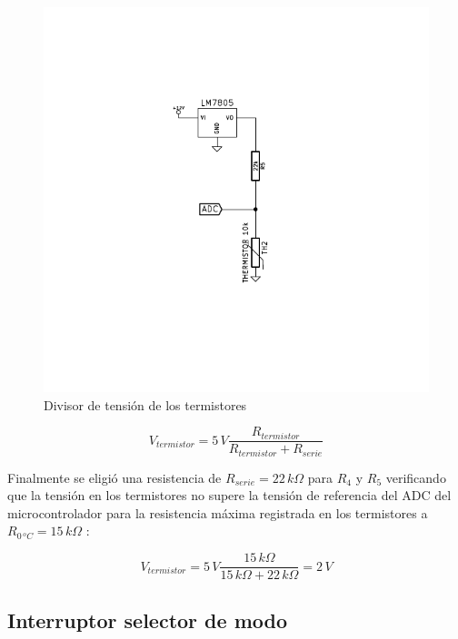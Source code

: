 \documentclass[10pt,spanish,a4paper,openany,notitlepage]{article}
\begin{document}
\begin{figure}[H] %
\begin{center}
\includegraphics[scale=1.25]{../circuitos/temperatura.pdf}
\caption{Divisor de tensión de los termistores}
 \label{fig:temperatura}
\end{center}
\end{figure}

\begin{equation}
V_{termistor} = 5\, \unit{V} \frac{R_{termistor}}{R_{termistor}+R_{serie}}
\label{eq:tension_termistor}
\end{equation}

Finalmente se eligió una resistencia de $R_{serie} = 22\, \unit{k\Omega}$
para $R_4$ y $R_5$ verificando que la tensión en los termistores no supere
la tensión de referencia del ADC del microcontrolador para la resistencia
máxima registrada en los termistores a $R_{0\,\unit{^oC}} = 15\, \unit{k\Omega}$ :

\[ \displaystyle V_{termistor} = 5\, \unit{V} \frac{15\, \unit{k\Omega}}{15\, \unit{k\Omega}+22\, \unit{k\Omega}} = 2\, \unit{V}\]

\subsection{Interruptor selector de modo}
\end{document}
